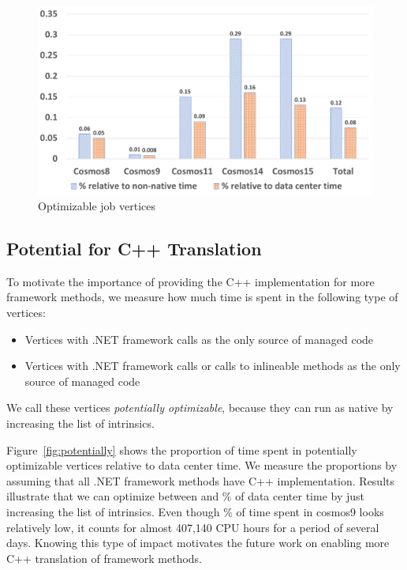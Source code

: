 \begin{figure}[ht]
\includegraphics[scale=0.8]{graphs/optimizable}
\caption{Optimizable job vertices}
\label{fig:optimizable}
\end{figure}

\subsection{Potential for C++ Translation}
To motivate the importance of providing the C++ implementation for more framework methods, we measure how much time is spent in the following type of vertices:
\begin{itemize}
\item Vertices with .NET framework calls as the only source of managed code
\item Vertices with .NET framework calls or calls to inlineable methods as the only source of managed code
\end{itemize}
We call these vertices \emph{potentially optimizable}, because they can run as native by increasing the list of intrinsics.

Figure~\ref{fig:potentially} shows the proportion of time spent in potentially optimizable vertices relative to data center time. We measure the proportions by assuming that all .NET framework methods have C++ implementation. Results illustrate that we can optimize between \potentiallyOptimizableL{} and \potentiallyOptimizableU{} \% of data center time by just increasing the list of intrinsics. Even though \potentiallyOptimizableL{} \% of time spent in cosmos9 looks relatively low, it counts for almost 407,140 CPU hours for a period of several days. Knowing this type of impact motivates the future work on enabling more C++ translation of framework methods.

